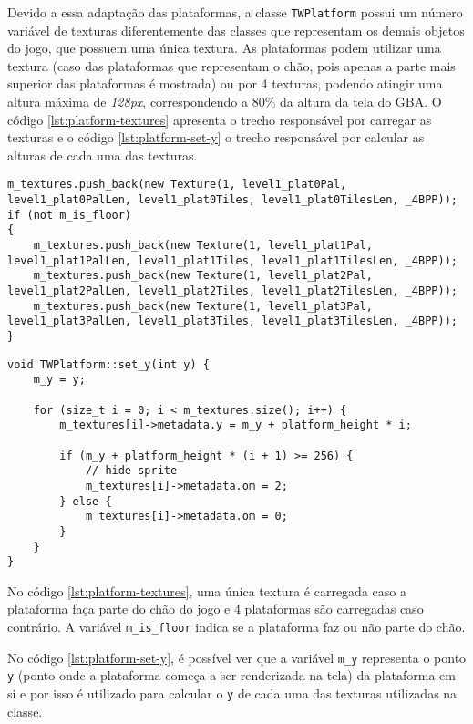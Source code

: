 Devido a essa adaptação das plataformas, a classe \texttt{TWPlatform} possui um número variável de texturas diferentemente das classes que representam os demais objetos do jogo, que possuem uma única textura. As plataformas podem utilizar uma textura (caso das plataformas que representam o chão, pois apenas a parte mais superior das plataformas é mostrada) ou por 4 texturas, podendo atingir uma altura máxima de \textit{128px}, correspondendo a 80\% da altura da tela do GBA. O código \ref{lst:platform-textures} apresenta o trecho responsável por carregar as texturas e o código \ref{lst:platform-set-y} o trecho responsável por calcular as alturas de cada uma das texturas.

\begin{lstlisting}[caption={\texttt{std::vector} com as texturas das plataformas sendo preenchido.},label={lst:platform-textures}]
m_textures.push_back(new Texture(1, level1_plat0Pal, level1_plat0PalLen, level1_plat0Tiles, level1_plat0TilesLen, _4BPP));
if (not m_is_floor)
{
    m_textures.push_back(new Texture(1, level1_plat1Pal, level1_plat1PalLen, level1_plat1Tiles, level1_plat1TilesLen, _4BPP));
    m_textures.push_back(new Texture(1, level1_plat2Pal, level1_plat2PalLen, level1_plat2Tiles, level1_plat2TilesLen, _4BPP));
    m_textures.push_back(new Texture(1, level1_plat3Pal, level1_plat3PalLen, level1_plat3Tiles, level1_plat3TilesLen, _4BPP));
}
\end{lstlisting}

\begin{lstlisting}[caption={Cálculo das alturas das texturas utilizadas nas plataformas},label={lst:platform-set-y}]
void TWPlatform::set_y(int y) {
    m_y = y;

    for (size_t i = 0; i < m_textures.size(); i++) {
        m_textures[i]->metadata.y = m_y + platform_height * i;

        if (m_y + platform_height * (i + 1) >= 256) {
            // hide sprite
            m_textures[i]->metadata.om = 2;
        } else {
            m_textures[i]->metadata.om = 0;
        }
    }
}
\end{lstlisting}

No código \ref{lst:platform-textures}, uma única textura é carregada caso a plataforma faça parte do chão do jogo e 4 plataformas são carregadas caso contrário. A variável \texttt{m\_is\_floor} indica se a plataforma faz ou não parte do chão.

No código \ref{lst:platform-set-y}, é possível ver que a variável \texttt{m\_y} representa o ponto \texttt{y} (ponto onde a plataforma começa a ser renderizada na tela) da plataforma em si e por isso é utilizado para calcular o \texttt{y} de cada uma das texturas utilizadas na classe.

